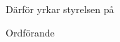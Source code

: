 \documentclass[../_main/handlingar.tex]{subfiles}
\begin{document}
\motionssvar


Därför yrkar styrelsen på
\begin{attsatser}
    \att
\end{attsatser}

\begin{signatures}{1}
    \ist
    \signature{Fredrik Peterson}{Ordförande}
\end{signatures}
\end{document}
